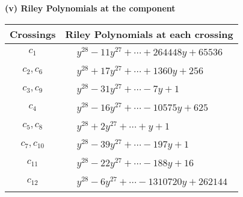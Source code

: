 \documentclass[1p]{elsarticle_modified}
\theoremstyle{definition}
\begin{document}
\newpage\renewcommand{\arraystretch}{1}
\flushleft \textbf{(v) Riley Polynomials at the component}\newline \\
\begin{tabular}{m{50pt}|m{274pt}}
Crossings & \hspace{64pt}Riley Polynomials at each crossing \\
\hline $$\begin{aligned}c_{1}\end{aligned}$$&$\begin{aligned}
&y^{28}-11 y^{27}+\cdots+264448 y+65536
\end{aligned}$\\
\hline $$\begin{aligned}c_{2},c_{6}\end{aligned}$$&$\begin{aligned}
&y^{28}+17 y^{27}+\cdots+1360 y+256
\end{aligned}$\\
\hline $$\begin{aligned}c_{3},c_{9}\end{aligned}$$&$\begin{aligned}
&y^{28}-31 y^{27}+\cdots-7 y+1
\end{aligned}$\\
\hline $$\begin{aligned}c_{4}\end{aligned}$$&$\begin{aligned}
&y^{28}-16 y^{27}+\cdots-10575 y+625
\end{aligned}$\\
\hline $$\begin{aligned}c_{5},c_{8}\end{aligned}$$&$\begin{aligned}
&y^{28}+2 y^{27}+\cdots+y+1
\end{aligned}$\\
\hline $$\begin{aligned}c_{7},c_{10}\end{aligned}$$&$\begin{aligned}
&y^{28}-39 y^{27}+\cdots-197 y+1
\end{aligned}$\\
\hline $$\begin{aligned}c_{11}\end{aligned}$$&$\begin{aligned}
&y^{28}-22 y^{27}+\cdots-188 y+16
\end{aligned}$\\
\hline $$\begin{aligned}c_{12}\end{aligned}$$&$\begin{aligned}
&y^{28}-6 y^{27}+\cdots-1310720 y+262144
\end{aligned}$\\
\hline
\end{tabular}\\~\\
\end{document}
